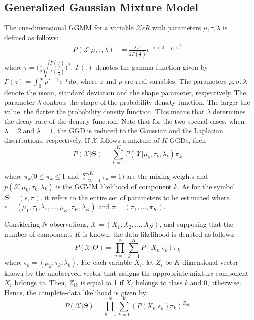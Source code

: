 \documentclass[conference]{IEEEtran}
\begin{document}
\subsection{Generalized Gaussian Mixture Model}
The one-dimensional GGMM for a variable $\mathcal{X} \epsilon R $ with parameters $\mu, \tau, \lambda$ is defined as follows:
\begin{equation}
    \begin{split}
        P(\mathcal{X}|\mu, \tau, \lambda) &= \frac{\lambda  \tau^\frac{1}{\lambda}}{2\Gamma(\frac{1}{\lambda})}
          e^{-\tau  |(\mathcal{X}-\mu)|^{\lambda}}    
    \end{split}
    \end{equation}
where $\tau = \bigg({\frac{1}{\sigma} \sqrt{\frac{\Gamma(\frac{3}{\lambda})}{\Gamma(\frac{1}{\lambda})}}}\bigg)^\lambda$, $\Gamma(.)$ denotes the gamma function given by $\Gamma(z) = \int_{0}^{\infty}p^{z-1}e^{-p} dp$, where $z$ and $p$ are real variables.
The parameters $\mu, \sigma, \lambda$  denote the mean, standard deviation and the shape parameter, respectively. The parameter $\lambda$ controls the shape of the probability density function.
The larger the value, the flatter the probability density function. This means that $\lambda$ determines the decay rate of the density function. 
Note that for the two special cases, when $\lambda = 2$ and $\lambda = 1$, the GGD is reduced to the Gaussian and the Laplacian distributions, respectively.
If $\mathcal{X}$ follows a mixture of $K$ GGDs, then 
\begin{equation}
    P(\mathcal{X}|\Theta) = \sum_{k = 1}^{K} P(\mathcal{X}|\mu_k, \tau_k, \lambda_k)\pi_k
\end{equation}


where $\pi_k(0\leq\pi_k\leq1$ and $\sum_{k=1}^{K} \pi_k = 1)$ are the mixing weights and $p(\mathcal{X}|\mu_k, \tau_k, \lambda_k)$ is the GGMM likelihood of component $k$. 
As for the symbol $\Theta = (\epsilon, \pi)$, it refers to the entire set of parameters to be estimated where $\epsilon = (\mu_1, \tau_1, \lambda_1, ..., \mu_K, \tau_K, \lambda_K)$ and $\pi=(\pi_1,...,\pi_K)$. 

Considering $N$ observations,  $\mathcal{X} = (X_1, X_2, ..., X_N)$, and supposing that the number of components $K$ is known, the data likelihood is denoted as follows:
\begin{equation}
    P(\mathcal{X}|\Theta) = \prod_{n = 1}^{N}\sum_{k=1}^{K} P({X}_n|\epsilon_k)\pi_k
\end{equation}
where $\epsilon_k = (\mu_k, \tau_k, \lambda_k)$. 
For each variable ${X}_i$, let $Z_i$  be $K$-dimensional vector known by the unobserved vector that assigns the appropriate mixture component ${X}_i$ belongs to. Then, $Z_{ik}$ is equal to 1 if ${X}_i$ belongs to class $k$ and 0, otherwise. Hence, the complete-data likelihood is given by:
\begin{equation}
    P(\mathcal{X}|\Theta) = \prod_{n = 1}^{N}\sum_{k=1}^{K} (P({X}_n|\epsilon_k)\pi_k)^{Z_{nk}}
\end{equation}
\end{document}
